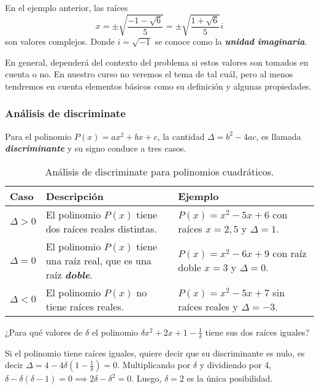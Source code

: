 En el ejemplo anterior, las raíces
\[
    x = \pm \sqrt {\frac{-1 - \sqrt{6}}{5}} = \pm \sqrt {\frac{1 + \sqrt{6}}{5}} i
\]
son valores complejos.
Donde $i = \sqrt {-1}$ se conoce como la \textbf{\emph{unidad imaginaria}}.

En general, dependerá del contexto del problema si estos valores son tomados en cuenta o no.
En nuestro curso no veremos el tema de  tal cuál, pero al menos tendremos en cuenta elementos básicos como su definición y algunas propiedades.



\subsubsection{Análisis de discriminate}

Para el polinomio $P(x) = ax^2 + bx + c$, la cantidad $\Delta = b^2 - 4ac$, es llamada \textbf{\emph{discriminante}} y su signo conduce a tres casos.
\begin{table}[H]
    \centering
    \begin{tabular}{| p{1.4cm} | p{6.5cm} | p{6.5cm} |}
        \hline
        Caso & Descripción & Ejemplo \\ \hline
        $\Delta > 0$ & El polinomio $P(x)$ tiene dos raíces reales distintas.&
            $P(x) = x^2 - 5x + 6$ con raíces $x = 2, 5$ y $\Delta = 1$. \\\hline
        $\Delta = 0$ & El polinomio $P(x)$ tiene una raíz real, que es una raíz \textbf{\emph{doble}}.&
            $P(x) = x^2 - 6x + 9$ con raíz doble $x = 3$ y $\Delta = 0$. \\\hline
        $\Delta < 0$ & El polinomio $P(x)$ no tiene raíces reales.&
            $P(x) = x^2 - 5x + 7$ sin raíces reales y $\Delta = -3$. \\\hline
    \end{tabular}
    \caption{Análisis de discriminate para polinomios cuadráticos.}
\end{table}

\begin{example}
    ¿Para qué valores de $\delta$ el polinomio $\delta x^2 + 2x + 1 - \frac{1}{\delta}$ tiene sus dos raíces iguales?
\end{example}
\begin{solution}
    Si el polinomio tiene raíces iguales, quiere decir que su discriminante es nulo, es decir $\Delta = 4 - 4\delta \left(1 - \frac{1}{\delta}\right) = 0$.
    Multiplicando por $\delta$ y dividiendo por 4, $ \delta - \delta (\delta - 1) = 0 \implies 2\delta - \delta^2 = 0$.
    Luego, $\delta = 2$ es la única posibilidad.
\end{solution}


